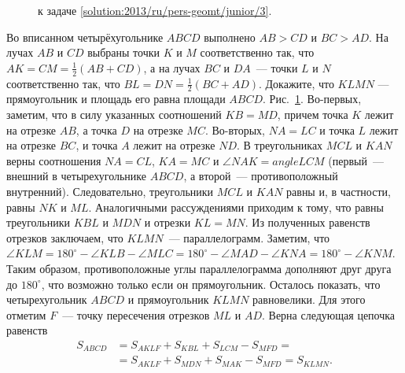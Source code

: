 \ifsolution
\begin{figure}\centering
    \caption{к задаче \ref{solution:2013/ru/pers-geomt/junior/3}.}
    \label{fig:solution:2013/ru/pers-geomt/junior/3}
\end{figure}
\fi %

\problem
Во вписанном четырёхугольнике $ABCD$ выполнено $AB > CD$ и $BC > AD$.
На лучах $AB$ и $CD$ выбраны точки $K$ и $M$ соответственно так, что
$AK = CM = \frac{1}{2} (AB + CD)$,
а на лучах $BC$ и $DA$~--- точки $L$ и $N$ соответственно так, что
$BL = DN = \frac{1}{2} (BC + AD)$.
Докажите, что $KLMN$ --- прямоугольник и 
площадь его равна площади $ABCD$.
\solution 
\label{solution:2013/ru/pers-geomt/junior/3}
Рис.~\ref{fig:solution:2013/ru/pers-geomt/junior/3}.
Во-первых, заметим, что в силу указанных соотношений $KB = MD$, причем точка
$K$ лежит на отрезке $AB$, а точка $D$ на отрезке $MC$.
Во-вторых, $NA = LC$ и точка $L$ лежит на отрезке $BC$, и точка $A$ лежит на
отрезке $ND$.
В треугольниках $MCL$ и $KAN$ верны соотношения $NA = CL$, $KA = MC$ и
$\angle NAK = angle LCM$ (первый~--- внешний в четырехугольнике $ABCD$, а
второй~--- противоположный внутренний).
Следовательно, треугольники $MCL$ и $KAN$ равны и, в частности, равны $NK$ и
$ML$.
Аналогичными рассуждениями приходим к тому, что равны треугольники $KBL$ и
$MDN$ и отрезки $KL = MN$.
Из полученных равенств отрезков заключаем, что $KLMN$~--- параллелограмм.
Заметим, что
\(
    \angle KLM
=
    180^\circ - \angle KLB - \angle MLC
=
    180^\circ - \angle MAD - \angle KNA
=
    180^\circ - \angle KNM
\).
Таким образом, противоположные углы параллелограмма дополняют друг друга до
$180^\circ$, что возможно только если он прямоугольник.
Осталось показать, что четырехугольник $ABCD$ и прямоугольник $KLMN$
равновелики.
Для этого отметим $F$~--- точку пересечения отрезков $ML$ и $AD$.
Верна следующая цепочка равенств
\begin{align*}
    S_{ABCD}
&{}=
    S_{AKLF} + S_{KBL} + S_{LCM} - S_{MFD}
=\\&{}=
    S_{AKLF} + S_{MDN} + S_{MAK} - S_{MFD}
=
    S_{KLMN}.
\end{align*}
\endproblem
